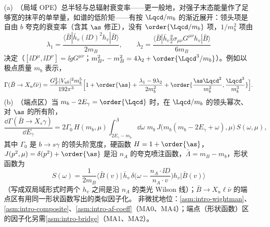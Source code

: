 \begin{theorem}\label{thm:heavy-inclusive-b}
(a)~（局域 OPE）总半轻与总辐射衰变率——更一般地，对强子末态能量作了足够宽的抹平的单举量，如谱的低阶矩——有按 $\Lqcd/m_b$ 的渐近展开：领头项是自由 $b$ 夸克的衰变率（含其 $\as$ 修正），没有 $\order{\Lqcd/m_b}$ 项，$1/m_b^2$ 项由
\begin{equation}\label{eq:heavy-lambda12}
\lambda_1=\frac{\langle\bar B|\bar h_v(\ii D)^2h_v|\bar B\rangle}{2m_B},\qquad
\lambda_2=\frac{\langle\bar B|\bar h_v\frac g2\sigma_{\mu\nu}G^{\mu\nu}h_v|\bar B\rangle}{6m_B}
\end{equation}
决定（$[\ii D^\mu,\ii D^\nu]=\ii gG^{\mu\nu}$；$m_{B^*}^2-m_B^2=4\lambda_2+\order{\Lqcd^3/m_b}$）。例如以极点质量 $m_b$ 表示，
\begin{equation}\label{eq:heavy-Gamma-bu}
\Gamma(\bar B\to X_u\ell\bar\nu)=\frac{G_F^2|V_{ub}|^2m_b^5}{192\pi^3}\Big[1+\order{\as}+\frac{\lambda_1-9\lambda_2}{2m_b^2}+\order{\frac{\as\Lqcd^2}{m_b^2},\frac{\Lqcd^3}{m_b^3}}\Big].
\end{equation}
(b)~（端点区）当 $m_b-2E_\gamma=\order{\Lqcd}$ 时，在 $\Lqcd/m_b$ 的领头幂次、对 $\as$ 的所有阶，
\begin{equation}\label{eq:heavy-HJS}
\frac{\dd\Gamma(\bar B\to X_s\gamma)}{\dd E_\gamma}=2\Gamma_0\,H(m_b,\mu)\int_{2E_\gamma-m_b}^{\bar\Lambda}\dd\omega\;m_b\,J\big(m_b(m_b-2E_\gamma+\omega),\mu\big)\,S(\omega,\mu),
\end{equation}
其中 $\Gamma_0$ 是 $b\to s\gamma$ 的领头阶宽度，硬函数 $H=1+\order{\as}$，$J(p^2,\mu)=\delta(p^2)+\order{\as}$ 是沿 $n_A$ 的夸克喷注函数，$\bar\Lambda=m_B-m_b$，形状函数为
\begin{equation}\label{eq:heavy-shape}
S(\omega)=\frac{1}{2m_B}\Big\langle\bar B(v)\Big|\,\bar h_v\,\delta\Big(\omega-\frac{n_A\cdot\ii D}{n_A\cdot v}\Big)h_v\Big|\bar B(v)\Big\rangle
\end{equation}
（写成双局域形式时两个 $h_v$ 之间是沿 $n_A$ 的类光 Wilson 线）；$\bar B\to X_u\ell\bar\nu$ 的端点区有用同一形状函数写出的类似因子化。
非微扰地位：\cref{asm:intro-wightman}、\cref{asm:intro-composite}、\cref{asm:intro-af-coeff}（MA0、MA4）；端点（形状函数）区的因子化另需\cref{asm:intro-bridge}（MA1、MA2）。
\end{theorem}

